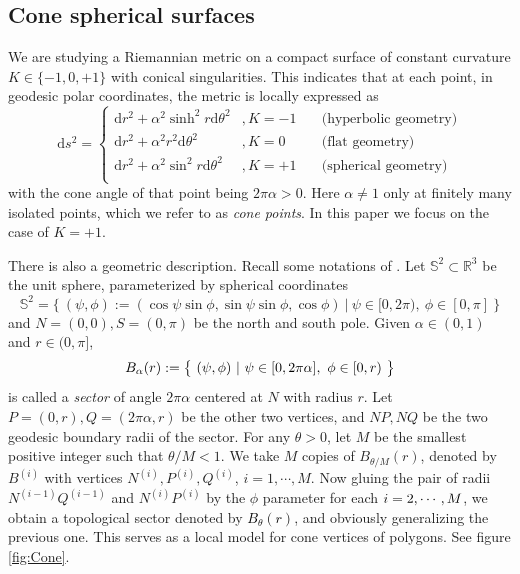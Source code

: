 \documentclass[pdflatex,sn-mathphys]{sn-jnl}%
\numberwithin{equation}{section}
\theoremstyle{thmstyleone}%
\newcommand{\STwo}{\mathbb{S}^2}
\newcommand{\csphsf}{cone spherical surface}
\newcommand{\SYM}{\textcolor{black}}
\newcommand{\DEF}{\emph}
\newcommand{\EMP}{\textcolor{black}}
\begin{document}
\subsection{Cone spherical surfaces}\label{sec:spherical_cone}
We are studying a Riemannian metric on a compact surface of constant curvature $K\in\{-1,0,+1\}$ with conical singularities.
This indicates that at each point, in geodesic polar coordinates, the metric is locally expressed as
\begin{equation*}
    \mathrm{d}s^2=\left\{   \begin{array}{lll}
        \mathrm{d}r^2 + \alpha^2 \sinh^2 r \mathrm{d}\theta^2 & , K=-1 & \quad \text{(hyperbolic geometry)} \\
        \mathrm{d}r^2 + \alpha^2 r^2 \mathrm{d}\theta^2 & , K=0 & \quad \text{(flat geometry)} \\
        \mathrm{d}r^2 + \alpha^2 \sin^2 r \mathrm{d}\theta^2 & , K=+1 & \quad \text{(spherical geometry)} \\
                \end{array}
    \right.
\end{equation*}
with the cone angle of that point being $2\pi\alpha>0$. Here $\alpha\neq1$ only at finitely many isolated points, which we refer to as \DEF{cone points}. In this paper we focus on the case of $K=+1$. %

\bigskip
There is also a geometric description. Recall some notations of \cite{MonPa16}.
Let $\mathbb{S}^2\subset\mathbb{R}^3$ be the unit sphere, parameterized by spherical coordinates
$$ \STwo = \big\{\ (\psi,\phi):=(\cos\psi\sin\phi, \sin\psi\sin\phi,\cos\phi) \ \big\rvert\ \psi\in[0,2\pi),\ \phi\in[0,\pi]\ \big\} $$
and $N=(0,0), S=(0,\pi)$ be the north and south pole.
Given $\alpha\in(0,1)$ and $r\in(0,\pi]$,
\[ \SYM{B_\alpha(r)} :=\big\{\ (\psi,\phi) \ \rvert\ \psi\in[0,2\pi\alpha],\ \phi\in[0,r)\ \big\} %
\]
is called a \DEF{sector} of angle $2\pi\alpha$ centered at $N$ with radius $r$. Let $P=(0, r), Q=(2\pi\alpha, r)$ be the other two vertices, and $NP, NQ$ be the two geodesic boundary radii of the sector.
For any $\theta>0$, let $M$ be the smallest positive integer such that $\theta/M<1$. We take $M$ copies of $B_{\theta/M}(r)$, denoted by $B^{(i)}$ with vertices $N^{(i)}, P^{(i)}, Q^{(i)}$, $i=1,\cdots, M$.
Now gluing the pair of radii $N^{(i-1)}Q^{(i-1)}$ and $N^{(i)}P^{(i)}$ by the $\phi$ parameter for each $i=\EMP{2},\cdots, M$, we obtain a topological sector denoted by \SYM{$B_{\theta}(r)$}, and obviously generalizing the previous one. This serves as a local model for cone vertices of polygons. See figure \ref{fig:Cone}.
\end{document}

